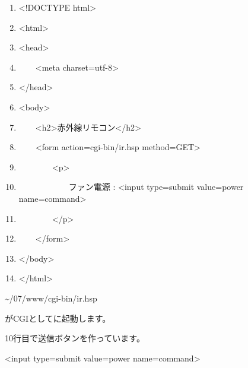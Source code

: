 \documentclass[a4paper,12pt,dvipdfmx]{jarticle}
\begin{document}
\centering
\begin{boxedminipage}{0.95\textwidth}
	\begin{enumerate}
	\baselineskip 10pt
	\setlength{\itemsep}{0cm}
	\item{\textless}!DOCTYPE html{\textgreater}

	\item{\textless}html{\textgreater}

	\item{\textless}head{\textgreater}

	\item\ \ \ \ {\textless}meta charset={\textquotedbl}utf-8{\textquotedbl}{\textgreater}

	\item{\textless}/head{\textgreater}

	\item{\textless}body{\textgreater}

	\item\ \ \ \ {\textless}h2{\textgreater}赤外線リモコン{\textless}/h2{\textgreater}

	\item\ \ \ \ {\textless}form action={\textquotedbl}cgi-bin/ir.hsp{\textquotedbl}
	method={\textquotedbl}GET{\textquotedbl}{\textgreater}

	\item\ \ \ \ \ \ \ \ {\textless}p{\textgreater}

	\item\ \ \ \ \ \ \ \ \ \ \ \ ファン電源 : {\textless}input type={\textquotedbl}submit{\textquotedbl}
	value={\textquotedbl}power{\textquotedbl} name={\textquotedbl}command{\textquotedbl}{\textgreater}

	\item\ \ \ \ \ \ \ \ {\textless}/p{\textgreater}

	\item\ \ \ \ {\textless}/form{\textgreater}

	\item{\textless}/body{\textgreater}

	\item{\textless}/html{\textgreater}
	\end{enumerate}
\end{boxedminipage}
\flushleft
{\textasciitilde}/07/www/cgi-bin/ir.hsp

がCGIとしてに起動します。

10行目で送信ボタンを作っています。

{\textless}input type={\textquotedbl}submit{\textquotedbl} value={\textquotedbl}power{\textquotedbl}
name={\textquotedbl}command{\textquotedbl}{\textgreater}
\end{document}
